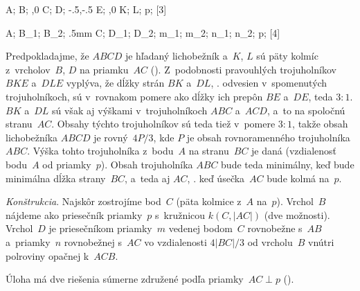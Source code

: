 {%
\fontplace
\rBpoint A; \lBpoint B; \bpoint{},0 C; \bpoint D;
\rpoint\xy-.5,-.5 E; \rBpoint{},0 K; \lpoint L;
\rpoint p;
[3] \hfil\Obr

\fontplace
\lbpoint A; \tpoint B_1; \tpoint B_2;
\tpoint\down.5mm C; \lpoint D_1; \rpoint D_2;
\rpoint m_1; \lpoint m_2;
\lBpoint n_1; \rBpoint n_2;
\rpoint p;
[4] \hfil\Obr

Predpokladajme, že $ABCD$ je hľadaný lichobežník a~$K$, $L$ sú
päty kolmíc z~vrcholov~$B$, $D$ na priamku~$AC$ (\obr).
Z~podobnosti pravouhlých trojuholníkov $BKE$ a~$DLE$ vyplýva, že
dĺžky strán $BK$ a~$DL$, \tj. odvesien v~spomenutých
trojuholníkoch, sú v~rovnakom pomere ako dĺžky ich
prepôn $BE$ a~$DE$, teda $3:1$. $BK$ a~$DL$ sú však aj výškami
v~trojuholníkoch $ABC$ a~$ACD$, a~to na spoločnú stranu~$AC$.
Obsahy týchto trojuholníkov sú teda tiež v~pomere $3:1$, takže
obsah lichobežníka $ABCD$ je rovný~$4P/3$, kde $P$ je obsah
rovnoramenného trojuholníka $ABC$. Výška tohto trojuholníka
z~bodu~$A$ na stranu~$BC$ je daná (vzdialenosť bodu~$A$ od
priamky~$p$). Obsah trojuholníka $ABC$ bude teda minimálny, keď bude
minimálna dĺžka strany~$BC$, a~teda aj $AC$, \tj. keď úsečka~$AC$
bude kolmá na~$p$.
\inspicture{}

\smallskip
{\it Konštrukcia\/}. Najskôr zostrojíme bod~$C$ (päta kolmice z~$A$
na~$p$). Vrchol~$B$ nájdeme ako priesečník priamky~$p$
s~kružnicou $k(C,|AC|)$ (dve možnosti). Vrchol~$D$ je priesečníkom
priamky~$m$ vedenej bodom~$C$ rovnobežne s~$AB$ a~priamky~$n$
rovnobežnej s~$AC$ vo vzdialenosti $4|BC|/3$ od vrcholu~$B$
vnútri polroviny opačnej k~$ACB$.

\zaver
Úloha má dve riešenia súmerne združené podľa
priamky~$AC\perp p$ (\obr).
\inspicture{}}

